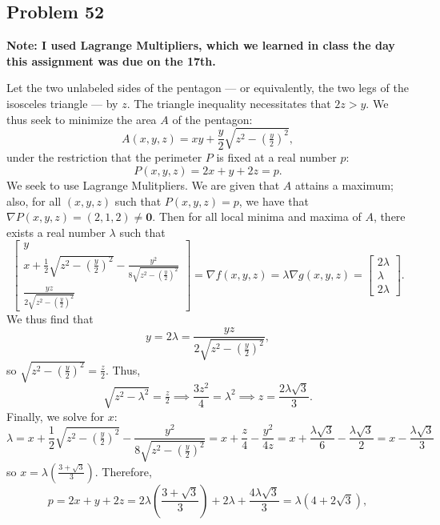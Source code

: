 \documentclass[11pt]{article}
\renewcommand{\vec}[1]{\mathbf{#1}}
\renewcommand{\grad}{\nabla}
\begin{document}

\subsection{Problem 52}

\textbf{Note: I used Lagrange Multipliers, which we learned in class the day this assignment was due on the 17th.}

Let the two unlabeled sides of the pentagon --- or equivalently, the two legs of the isosceles triangle --- by $z$. The triangle inequality necessitates that $2z > y$. We thus seek to minimize the area $A$ of the pentagon:
\[
	A(x, y, z) = xy + \frac{y}{2} \sqrt{z^{2} - \left(\tfrac{y}{2}\right)^{2}},
\]
under the restriction that the perimeter $P$ is fixed at a real number $p$:
\[
	P(x, y, z) = 2x + y + 2z = p.
\]
We seek to use Lagrange Mulitpliers. We are given that $A$ attains a maximum; also, for all $(x, y, z)$ such that $P(x, y, z) = p$, we have that $\grad P (x, y, z) = (2, 1, 2) \ne \vec{0}$. Then for all local minima and maxima of $A$, there exists a real number $\lambda$ such that
\[
	\begin{bmatrix} y \\ x + \frac{1}{2} \sqrt{z^{2} - \left( \tfrac{y}{2} \right)^{2}} - \frac{y^{2}}{8\sqrt{z^{2} - \left( \tfrac{y}{2} \right)^{2}}} \\ \frac{yz}{2\sqrt{z^{2} - \left( \tfrac{y}{2} \right)^{2}}} \end{bmatrix} = \grad f(x, y, z) = \lambda \grad g (x, y, z) = \begin{bmatrix} 2\lambda \\ \lambda \\ 2\lambda \end{bmatrix}.
\]
We thus find that
\[
	y = 2\lambda = \frac{yz}{2\sqrt{z^{2} - \left( \tfrac{y}{2} \right)^{2}}},
\]
so $\sqrt{z^{2} - \left( \tfrac{y}{2} \right)^{2}} = \tfrac{z}{2}$. Thus,
\[
	\sqrt{z^{2} - \lambda^{2}} = \tfrac{z}{2} \implies \frac{3z^{2}}{4} = \lambda^{2} \implies  z = \frac{2\lambda \sqrt{3}}{3}.
\]
Finally, we solve for $x$:
\[
	\lambda = x + \frac{1}{2} \sqrt{z^{2} - \left( \tfrac{y}{2} \right)^{2}} - \frac{y^{2}}{8\sqrt{z^{2} - \left( \tfrac{y}{2} \right)^{2}}}  = x + \frac{z}{4} - \frac{y^{2}}{4z} = x + \frac{\lambda \sqrt{3}}{6} - \frac{\lambda \sqrt{3}}{2} = x - \frac{\lambda\sqrt{3}}{3}
\]
so $x = \lambda \left(\tfrac{3 + \sqrt{3}}{3}\right)$. Therefore, 
\[
	p = 2x + y + 2z = 2\lambda \left( \frac{3 + \sqrt{3}}{3} \right) + 2\lambda + \frac{4\lambda \sqrt{3}}{3} = \lambda (4 + 2 \sqrt{3}),
\]
\end{document}
